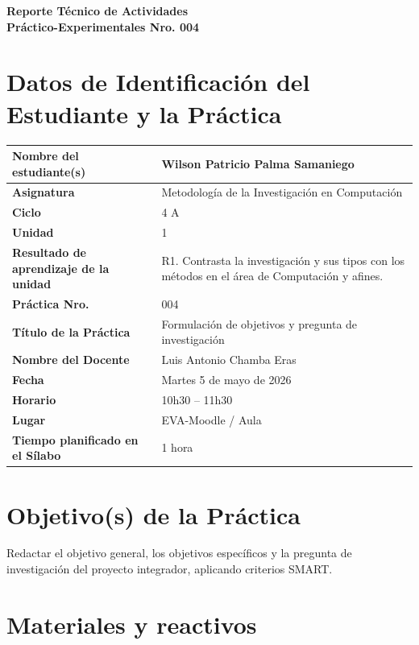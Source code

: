 \documentclass[11pt,a4paper]{article}
\begin{document}
\thispagestyle{fancy}

\vspace*{0.15cm}

\begin{center}
{\bfseries\fontsize{23}{26}\selectfont
Reporte Técnico de Actividades\\
Práctico-Experimentales Nro. 004\par}
\end{center}

\section{Datos de Identificación del Estudiante y la Práctica}

\noindent
\begin{tabularx}{\textwidth}{|L{0.43\textwidth}|Y|}
\hline
\textbf{Nombre del estudiante(s)} & Wilson Patricio Palma Samaniego \\ \hline
\textbf{Asignatura} & Metodología de la Investigación en Computación \\ \hline
\textbf{Ciclo} & 4 A \\ \hline
\textbf{Unidad} & 1 \\ \hline
\textbf{Resultado de aprendizaje de la unidad} & R1. Contrasta la investigación y sus tipos con los métodos en el área de Computación y afines. \\ \hline
\textbf{Práctica Nro.} & 004 \\ \hline
\textbf{Título de la Práctica} & Formulación de objetivos y pregunta de investigación \\ \hline
\textbf{Nombre del Docente} & Luis Antonio Chamba Eras \\ \hline
\textbf{Fecha} & Martes 5 de mayo de 2026 \\ \hline
\textbf{Horario} & 10h30 -- 11h30 \\ \hline
\textbf{Lugar} & EVA-Moodle / Aula \\ \hline
\textbf{Tiempo planificado en el Sílabo} & 1 hora \\ \hline
\end{tabularx}

\section{Objetivo(s) de la Práctica}
Redactar el objetivo general, los objetivos específicos y la pregunta de investigación del proyecto integrador, aplicando criterios SMART.

\section{Materiales y reactivos}
\end{document}

